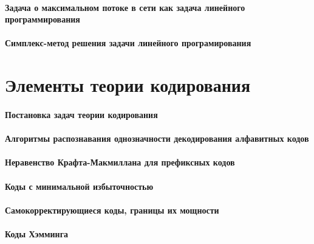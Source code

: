 \documentclass[russian,twocolumn]{article}
\begin{document}
\paragraph{Задача о максимальном потоке в сети как задача линейного программирования}

\paragraph{Симплекс-метод решения задачи линейного програмирования}

\section{Элементы теории кодирования}

\paragraph{Постановка задач теории кодирования}

\paragraph{Алгоритмы распознавания однозначности декодирования алфавитных кодов}

\paragraph{Неравенство Крафта-Макмиллана для префиксных кодов}

\paragraph{Коды с минимальной избыточностью}

\paragraph{Самокорректирующиеся коды, границы их мощности}

\paragraph{Коды Хэмминга}
\end{document}
